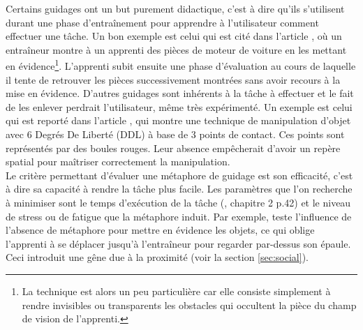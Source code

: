 \documentclass[11pt]{article}
\begin{document}
Certains guidages ont un but purement didactique, c'est à dire qu'ils s'utilisent durant une phase d'entraînement pour apprendre à l'utilisateur comment effectuer une tâche. Un bon exemple est celui qui est cité dans l'article \cite{show-through}, où un entraîneur montre à un apprenti des pièces de moteur de voiture en les mettant en évidence\footnote{La technique est alors un peu particulière car elle consiste simplement à rendre invisibles ou transparents les obstacles qui occultent la pièce du champ de vision de l'apprenti.}. L'apprenti subit ensuite une phase d'évaluation au cours de laquelle il tente de retrouver les pièces successivement montrées sans avoir recours à la mise en évidence. D'autres guidages sont inhérents à la tâche à effectuer et le fait de les enlever perdrait l'utilisateur, même très expérimenté. Un exemple est celui qui est reporté dans l'article \cite{3-hand}, qui montre une technique de manipulation d'objet avec 6 Degrés De Liberté (DDL) à base de 3 points de contact. Ces points sont représentés par des boules rouges. Leur absence empêcherait d'avoir un repère spatial pour maîtriser correctement la manipulation.
\\

Le critère permettant d'évaluer une métaphore de guidage est son efficacité, c'est à dire sa capacité à rendre la tâche plus facile. Les paramètres que l'on recherche à minimiser sont le temps d'exécution de la tâche (\cite{trv2}, chapitre 2 p.42) et le niveau de stress ou de fatigue que la métaphore induit. Par exemple, \cite{show-through} teste l'influence de l'absence de métaphore pour mettre en évidence les objets, ce qui oblige l'apprenti à se déplacer jusqu'à l'entraîneur pour regarder par-dessus son épaule. Ceci introduit une gêne due à la proximité (voir la section \ref{sec:social}).
\\
\end{document}
